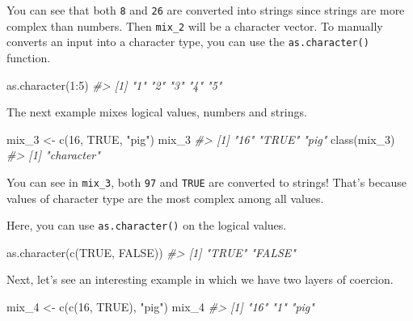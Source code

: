 \documentclass[
]{book}
\newenvironment{Shaded}{\begin{snugshade}}{\end{snugshade}}
\newcommand{\CommentTok}[1]{\textcolor[rgb]{0.56,0.35,0.01}{\textit{#1}}}
\newcommand{\ConstantTok}[1]{\textcolor[rgb]{0.00,0.00,0.00}{#1}}
\newcommand{\DecValTok}[1]{\textcolor[rgb]{0.00,0.00,0.81}{#1}}
\newcommand{\FunctionTok}[1]{\textcolor[rgb]{0.00,0.00,0.00}{#1}}
\newcommand{\NormalTok}[1]{#1}
\newcommand{\OtherTok}[1]{\textcolor[rgb]{0.56,0.35,0.01}{#1}}
\newcommand{\SpecialCharTok}[1]{\textcolor[rgb]{0.00,0.00,0.00}{#1}}
\newcommand{\StringTok}[1]{\textcolor[rgb]{0.31,0.60,0.02}{#1}}
\begin{document}
You can see that both \texttt{8} and \texttt{26} are converted into strings since strings are more complex than numbers. Then \texttt{mix\_2} will be a character vector. To manually converts an input into a character type, you can use the \texttt{as.character()} function.

\begin{Shaded}
\begin{Highlighting}[]
\FunctionTok{as.character}\NormalTok{(}\DecValTok{1}\SpecialCharTok{:}\DecValTok{5}\NormalTok{)}
\CommentTok{\#\textgreater{} [1] "1" "2" "3" "4" "5"}
\end{Highlighting}
\end{Shaded}

The next example mixes logical values, numbers and strings.

\begin{Shaded}
\begin{Highlighting}[]
\NormalTok{mix\_3 }\OtherTok{\textless{}{-}} \FunctionTok{c}\NormalTok{(}\DecValTok{16}\NormalTok{, }\ConstantTok{TRUE}\NormalTok{, }\StringTok{"pig"}\NormalTok{)}
\NormalTok{mix\_3}
\CommentTok{\#\textgreater{} [1] "16"   "TRUE" "pig"}
\FunctionTok{class}\NormalTok{(mix\_3)}
\CommentTok{\#\textgreater{} [1] "character"}
\end{Highlighting}
\end{Shaded}

You can see in \texttt{mix\_3}, both \texttt{97} and \texttt{TRUE} are converted to strings! That's because values of character type are the most complex among all values.

Here, you can use \texttt{as.character()} on the logical values.

\begin{Shaded}
\begin{Highlighting}[]
\FunctionTok{as.character}\NormalTok{(}\FunctionTok{c}\NormalTok{(}\ConstantTok{TRUE}\NormalTok{, }\ConstantTok{FALSE}\NormalTok{))}
\CommentTok{\#\textgreater{} [1] "TRUE"  "FALSE"}
\end{Highlighting}
\end{Shaded}

Next, let's see an interesting example in which we have two layers of coercion.

\begin{Shaded}
\begin{Highlighting}[]
\NormalTok{mix\_4 }\OtherTok{\textless{}{-}} \FunctionTok{c}\NormalTok{(}\FunctionTok{c}\NormalTok{(}\DecValTok{16}\NormalTok{, }\ConstantTok{TRUE}\NormalTok{), }\StringTok{"pig"}\NormalTok{)}
\NormalTok{mix\_4}
\CommentTok{\#\textgreater{} [1] "16"  "1"   "pig"}
\end{Highlighting}
\end{Shaded}
\end{document}
